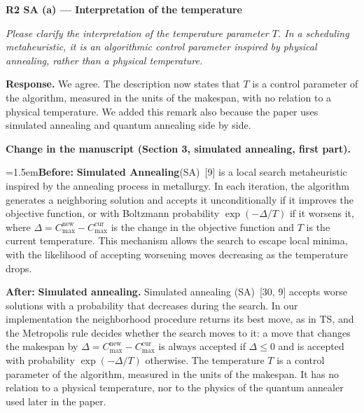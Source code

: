 \documentclass[12pt]{article}
\newenvironment{rc}[1]{\par\medskip\noindent\textbf{#1}\par\nopagebreak\noindent\itshape\renewcommand{\emph}[1]{\textbf{##1}}\ignorespaces}{\par}
\newcommand{\answer}[1]{\par\smallskip\noindent\textbf{Response.} #1\par}
\newcommand{\change}[3]{\par\smallskip\noindent\textbf{Change in the manuscript (#1).}\par
  {\leftskip=1.5em\noindent\textbf{Before:} #2\par\noindent\textbf{After:} #3\par}}
\begin{document}
\begin{rc}{R2 SA (a) --- Interpretation of the temperature}
Please clarify the interpretation of the temperature parameter $T$. In a scheduling metaheuristic, it is an algorithmic control parameter inspired by physical annealing, rather than a physical temperature.
\end{rc}
\answer{We agree. The description now states that $T$ is a control parameter of the algorithm, measured in the units of the makespan, with no relation to a physical temperature. We added this remark also because the paper uses simulated annealing and quantum annealing side by side.}
\change{Section 3, simulated annealing, first part}{\textbf{Simulated Annealing}(SA)~[9] is a local search metaheuristic inspired by the annealing process in metallurgy. In each iteration, the algorithm generates a neighboring solution and accepts it unconditionally if it improves the objective function, or with Boltzmann probability $\exp(-\Delta/T)$ if it worsens it, where $\Delta = C_{\max}^{\text{new}} - C_{\max}^{\text{cur}}$ is the change in the objective function and $T$ is the current temperature. This mechanism allows the search to escape local minima, with the likelihood of accepting worsening moves decreasing as the temperature drops.}{\textbf{Simulated annealing.} Simulated annealing (SA)~[30, 9] accepts worse solutions with a probability that decreases during the search. In our implementation the neighborhood procedure returns its best move, as in TS, and the Metropolis rule decides whether the search moves to it: a move that changes the makespan by $\Delta=C_{\max}^{\text{new}}-C_{\max}^{\text{cur}}$ is always accepted if $\Delta\le 0$ and is accepted with probability $\exp(-\Delta/T)$ otherwise. The temperature $T$ is a control parameter of the algorithm, measured in the units of the makespan. It has no relation to a physical temperature, nor to the physics of the quantum annealer used later in the paper.}
\end{document}

